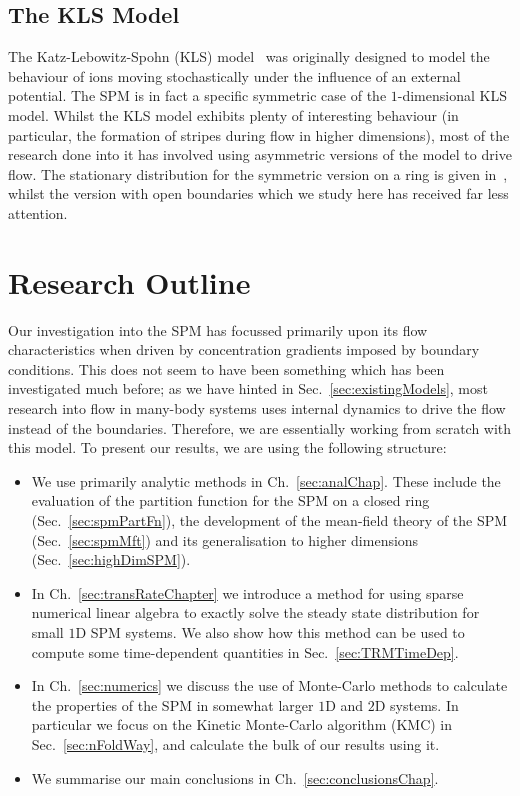 \subsection{The KLS Model}
The Katz-Lebowitz-Spohn (KLS) model~\cite{Katz1984, Zia2010} was originally designed to model the
behaviour of ions moving stochastically
under the influence of an external potential. The SPM is in fact a specific symmetric case of the
$1$-dimensional KLS model. Whilst the KLS model exhibits plenty of interesting behaviour
(in particular, the formation of stripes during flow in higher dimensions), most of the research done
into it has involved using asymmetric versions of the model to drive flow. The stationary
distribution for the symmetric version on a ring is given in~\cite{Katz1984}, whilst the version with open boundaries
which we study here has received far less attention.

\section{Research Outline}
Our investigation into the SPM has focussed primarily upon its flow characteristics when driven
by concentration gradients imposed by boundary conditions. This does not seem to have been something
which has been investigated much before; as we have hinted in Sec.~\ref{sec:existingModels}, most
research into flow in many-body systems uses internal dynamics to drive the flow instead of the 
boundaries. Therefore, we are essentially working from scratch with this model.
To present our results, we are using the following structure:
\begin{itemize}
 \item We use primarily analytic methods in Ch.~\ref{sec:analChap}. These include the evaluation
 of the partition function for the SPM on a closed ring (Sec.~\ref{sec:spmPartFn}), the development
 of the mean-field theory of the SPM (Sec.~\ref{sec:spmMft}) and its generalisation to higher dimensions
 (Sec.~\ref{sec:highDimSPM}).
 \item In Ch.~\ref{sec:transRateChapter} we introduce a method for using sparse numerical linear
 algebra to exactly solve the steady state distribution for small $1$D SPM systems. We also show how this
 method can be used to compute some time-dependent quantities in Sec.~\ref{sec:TRMTimeDep}.
 \item In Ch.~\ref{sec:numerics} we discuss the use of Monte-Carlo methods to calculate the properties
 of the SPM in somewhat larger $1$D and $2$D systems. In particular we focus on the Kinetic
  Monte-Carlo algorithm (KMC) in Sec.~\ref{sec:nFoldWay}, and calculate the bulk of our results
  using it.
\item We summarise our main conclusions in Ch.~\ref{sec:conclusionsChap}.
\end{itemize}


